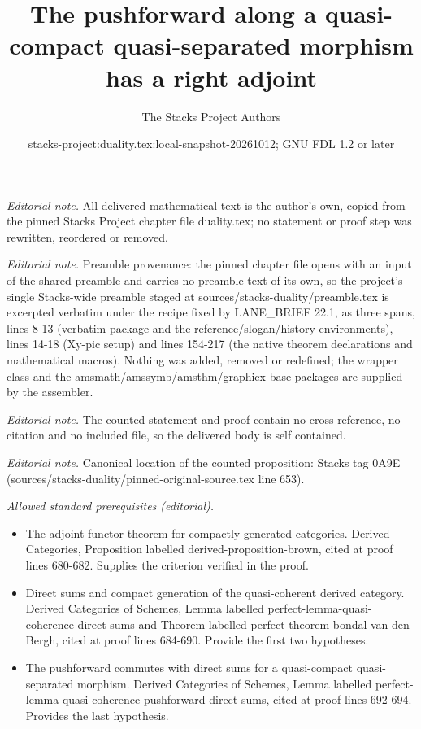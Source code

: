 \documentclass[10pt,a4paper]{amsart}
\title{The pushforward along a quasi-compact quasi-separated morphism has a right adjoint}
\author{The Stacks Project Authors}
\date{stacks-project:duality.tex:local-snapshot-20261012; GNU FDL 1.2 or later}
\theoremstyle{plain}
\theoremstyle{definition}
\theoremstyle{remark}
\numberwithin{equation}{subsection}
\begin{document}
\maketitle
\noindent\textit{Editorial note.} All delivered mathematical text is the author's own, copied from the pinned Stacks Project chapter file duality.tex; no statement or proof step was rewritten, reordered or removed.\par\medskip
\noindent\textit{Editorial note.} Preamble provenance: the pinned chapter file opens with an input of the shared preamble and carries no preamble text of its own, so the project's single Stacks-wide preamble staged at sources/stacks-duality/preamble.tex is excerpted verbatim under the recipe fixed by LANE\_BRIEF 22.1, as three spans, lines 8-13 (verbatim package and the reference/slogan/history environments), lines 14-18 (Xy-pic setup) and lines 154-217 (the native theorem declarations and mathematical macros). Nothing was added, removed or redefined; the wrapper class and the amsmath/amssymb/amsthm/graphicx base packages are supplied by the assembler.\par\medskip
\noindent\textit{Editorial note.} The counted statement and proof contain no cross reference, no citation and no included file, so the delivered body is self contained.\par\medskip
\noindent\textit{Editorial note.} Canonical location of the counted proposition: Stacks tag 0A9E (sources/stacks-duality/pinned-original-source.tex line 653).\par\medskip
\noindent\textit{Allowed standard prerequisites (editorial).}\begin{itemize}
\item The adjoint functor theorem for compactly generated categories. Derived Categories, Proposition labelled derived-proposition-brown, cited at proof lines 680-682. Supplies the criterion verified in the proof.
\item Direct sums and compact generation of the quasi-coherent derived category. Derived Categories of Schemes, Lemma labelled perfect-lemma-quasi-coherence-direct-sums and Theorem labelled perfect-theorem-bondal-van-den-Bergh, cited at proof lines 684-690. Provide the first two hypotheses.
\item The pushforward commutes with direct sums for a quasi-compact quasi-separated morphism. Derived Categories of Schemes, Lemma labelled perfect-lemma-quasi-coherence-pushforward-direct-sums, cited at proof lines 692-694. Provides the last hypothesis.
\end{itemize}\medskip
\end{document}
